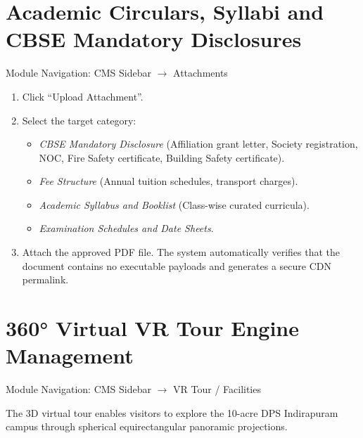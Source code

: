 \documentclass[11pt,a4paper,oneside]{report}
\def\textbf#1{#1}
\def\texttt#1{#1}
\def\&{and}
\begin{document}
\section{Academic Circulars, Syllabi \& CBSE Mandatory Disclosures}

\textbf{Module Navigation:} CMS Sidebar $\rightarrow$ \texttt{Attachments}

\begin{enumerate}
  \item Click \textbf{``Upload Attachment''}.
  \item Select the target category:
        \begin{itemize}
          \item \textit{CBSE Mandatory Disclosure} (Affiliation grant letter, Society registration, NOC, Fire Safety certificate, Building Safety certificate).
          \item \textit{Fee Structure} (Annual tuition schedules, transport charges).
          \item \textit{Academic Syllabus \& Booklist} (Class-wise curated curricula).
          \item \textit{Examination Schedules \& Date Sheets}.
        \end{itemize}
  \item Attach the approved PDF file. The system automatically verifies that the document contains no executable payloads and generates a secure CDN permalink.
\end{enumerate}

\section{360° Virtual VR Tour Engine Management}

\textbf{Module Navigation:} CMS Sidebar $\rightarrow$ \texttt{VR Tour / Facilities}

The 3D virtual tour enables visitors to explore the 10-acre DPS Indirapuram campus
through spherical equirectangular panoramic projections.
\end{document}
